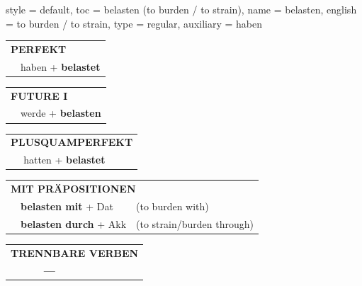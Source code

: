 \begin{verbentry}{
  style = {default},
  toc = {belasten (to burden / to strain)},
  name = {belasten},
  english = {to burden / to strain},
  type = {regular},
  auxiliary = {haben}
}
 \begin{tabular}{rl}
     \multicolumn{2}{l}{\textbf{PERFEKT}}\\
   & haben + \textbf{belastet}\\
  \end{tabular}
\hfill
   \begin{tabular}{rl}
    \multicolumn{2}{l}{\textbf{FUTURE I} }\\
   & werde + \textbf{belasten}\\
  \end{tabular}
\hfill
   \begin{tabular}{rl}
      \multicolumn{2}{l}{\textbf{PLUSQUAMPERFEKT}}\\
   & hatten + \textbf{belastet}\\
  \end{tabular}

   \vspace{10pt}

   \begin{tabular}{lll}
      \multicolumn{3}{l}{\textbf{MIT PRÄPOSITIONEN}}\\
& \textbf{belasten mit} + Dat & (to burden with)\\
& \textbf{belasten durch} + Akk & (to strain/burden through)\\
\end{tabular}
  \hfill
   \begin{tabular}{lll}
\multicolumn{3}{l}{\textbf{TRENNBARE VERBEN}}\\
& \textbf{---} & \\
\end{tabular}

  \vspace{-5pt}
\end{verbentry}

